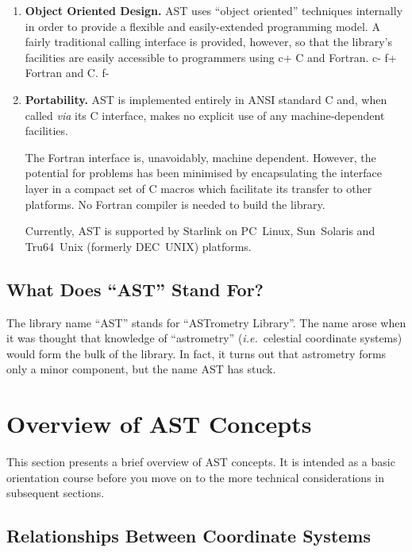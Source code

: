 \documentclass[twoside,11pt]{starlink}
\begin{document}
\begin{enumerate}
A JNI interface (known as ``JNIAST'' - see
\url{http://www.starlink.ac.uk/jniast/}) has also been developed by Starlink
which allows AST to be used from Java.

\item {\bf{Object Oriented Design.}}
AST uses ``object oriented'' techniques internally in order to provide
a flexible and easily-extended programming model.  A fairly
traditional calling interface is provided, however, so that the
library's facilities are easily accessible to programmers using
c+
C and Fortran.
c-
f+
Fortran and C.
f-

\item {\bf{Portability.}}
AST is implemented entirely in ANSI standard C and, when called
\emph{via} its C interface, makes no explicit use of any
machine-dependent facilities.

The Fortran interface is, unavoidably, machine dependent. However, the
potential for problems has been minimised by encapsulating the
interface layer in a compact set of C macros which facilitate its
transfer to other platforms. No Fortran compiler is needed to build
the library.

Currently, AST is supported by Starlink on PC~Linux, Sun~Solaris and
Tru64~Unix (formerly DEC~UNIX) platforms.
\end{enumerate}

\subsection{What Does ``AST'' Stand For?}

The library name ``AST'' stands for ``ASTrometry Library''. The name
arose when it was thought that knowledge of ``astrometry''
(\emph{i.e.}\ celestial coordinate systems) would form the bulk of the
library.  In fact, it turns out that astrometry forms only a minor
component, but the name AST has stuck.

\cleardoublepage
\section{Overview of AST Concepts}

This section presents a brief overview of AST concepts. It is intended
as a basic orientation course before you move on to the more technical
considerations in subsequent sections.

\subsection{\label{ss:mappingoverview}Relationships Between Coordinate Systems}
\end{document}
